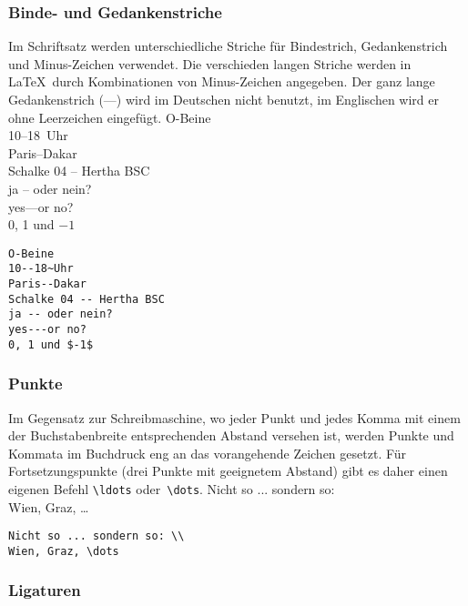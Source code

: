 
\subsubsection{Binde- und Gedankenstriche}
 
Im Schriftsatz werden unterschiedliche Striche für Bindestrich,
Gedankenstrich und Minus-Zeichen verwendet.
Die verschieden langen Striche werden in \LaTeX\ durch
Kombinationen von Minus-Zeichen angegeben. Der ganz lange
Gedankenstrich (\mbox{---}) wird im Deutschen nicht benutzt, im
Englischen wird er ohne Leerzeichen eingefügt.
\exa
O-Beine \\
10--18~Uhr \\
Paris--Dakar \\
Schalke 04 -- Hertha BSC \\
ja -- oder nein? \\
yes---or no? \\
0, 1 und $-1$
\exb
\begin{verbatim}
O-Beine
10--18~Uhr
Paris--Dakar
Schalke 04 -- Hertha BSC
ja -- oder nein?
yes---or no?
0, 1 und $-1$
\end{verbatim}
\exc
 
\subsubsection{Punkte}
 
Im Gegensatz zur Schreibmaschine, wo jeder Punkt und jedes Komma
mit einem der Buchstabenbreite entsprechenden Abstand versehen
ist, werden Punkte und Kommata im Buchdruck eng an das
vorangehende Zeichen gesetzt. Für Fortsetzungspunkte (drei
Punkte mit geeignetem Abstand) gibt es daher einen eigenen Befehl
\verb|\ldots| oder~\verb|\dots|.
\exa
Nicht so ... sondern so: \\
Wien, Graz, \dots
\exb
\begin{verbatim}
Nicht so ... sondern so: \\
Wien, Graz, \dots
\end{verbatim}
\exc
 
\subsubsection{Ligaturen}
 
